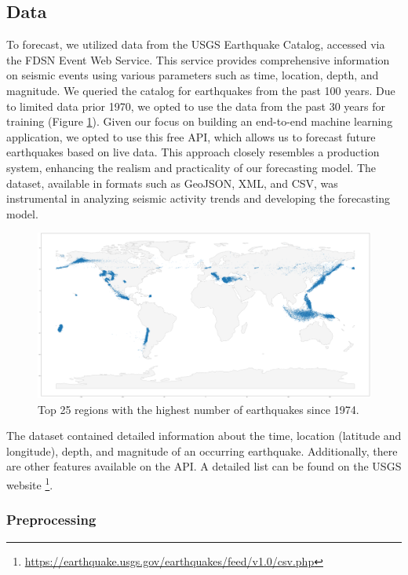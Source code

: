 \subsection{Data}
To forecast, we utilized data from the \ac{USGS} Earthquake Catalog, accessed via
the \ac{FDSN} Event Web Service. This service provides comprehensive information
on seismic events using various parameters such as time, location, depth, and magnitude.
We queried the catalog for earthquakes from the past 100 years. Due to
limited data prior 1970, we opted to use the data from the past 30 years
for training (Figure \ref{fig:world-map}). Given our focus on building an end-to-end machine learning
application, we opted to use this free API, which allows us to forecast
future earthquakes based on live data. This approach closely resembles a
production system, enhancing the realism and practicality of our forecasting
model. The dataset, available in formats such as GeoJSON, XML, and CSV, was
instrumental in analyzing seismic activity trends and developing the forecasting model.


\begin{figure}[hbtp]
  \centering
  \includegraphics[scale=0.13]{img/world-earthquakes-top-25-regions-past-30-years.png}
  \captionsetup{format=hang}
  \caption{\label{fig:world-map}Top 25 regions with the highest number of earthquakes since 1974.}
\end{figure}

The dataset contained detailed information about the time, location (latitude and longitude),
depth, and magnitude of an occurring earthquake. Additionally, there are other features
available on the API. A detailed list can be found on the \ac{USGS} website
\footnote{\url{https://earthquake.usgs.gov/earthquakes/feed/v1.0/csv.php}}.

\subsubsection{Preprocessing}

